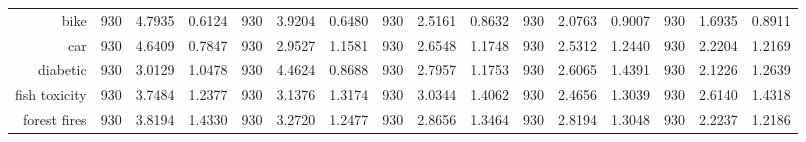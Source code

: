 \begin{table}[htbp]
{\begin{tabular}{rccccccccccccccc}
			bike                                & 930                                      & 4.7935                                                                    & 0.6124          & 930                            & 3.9204          & 0.6480          & 930                             & 2.5161          & 0.8632          & 930                             & 2.0763                                                                    & 0.9007          & 930                             & \cellcolor[rgb]{ .776,  .937,  .808}\textcolor[rgb]{ 0,  .38,  0}{1.6935}          & 0.8911          \\
			car                                 & 930                                      & 4.6409                                                                    & 0.7847          & 930                            & 2.9527          & 1.1581          & 930                             & 2.6548          & 1.1748          & 930                             & 2.5312                                                                    & 1.2440          & 930                             & \cellcolor[rgb]{ .776,  .937,  .808}\textcolor[rgb]{ 0,  .38,  0}{2.2204}          & 1.2169          \\
			diabetic                            & 930                                      & 3.0129                                                                    & 1.0478          & 930                            & 4.4624          & 0.8688          & 930                             & 2.7957          & 1.1753          & 930                             & 2.6065                                                                    & 1.4391          & 930                             & \cellcolor[rgb]{ .776,  .937,  .808}\textcolor[rgb]{ 0,  .38,  0}{2.1226}          & 1.2639          \\
			fish toxicity                       & 930                                      & 3.7484                                                                    & 1.2377          & 930                            & 3.1376          & 1.3174          & 930                             & 3.0344          & 1.4062          & 930                             & \cellcolor[rgb]{ .776,  .937,  .808}\textcolor[rgb]{ 0,  .38,  0}{2.4656} & 1.3039          & 930                             & 2.6140                                                                             & 1.4318          \\
			forest fires                        & 930                                      & 3.8194                                                                    & 1.4330          & 930                            & 3.2720          & 1.2477          & 930                             & 2.8656          & 1.3464          & 930                             & 2.8194                                                                    & 1.3048          & 930                             & \cellcolor[rgb]{ .776,  .937,  .808}\textcolor[rgb]{ 0,  .38,  0}{2.2237}          & 1.2186          \\

\end{tabular}}
\end{table}
